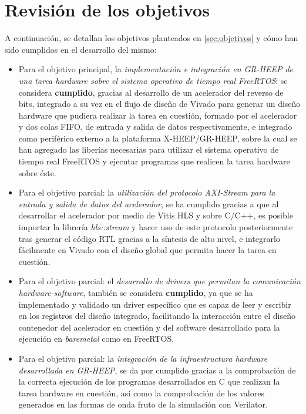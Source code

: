 \section{Revisión de los objetivos}
A continuación, se detallan los objetivos planteados en \ref{sec:objetivos} y cómo han sido cumplidos en el desarrollo del mismo:

\begin{itemize}
    \item Para el objetivo principal, la \emph{implementación e integración en GR-HEEP de una tarea hardware sobre el sistema operativo de tiempo real FreeRTOS}: se considera \textbf{cumplido}, gracias al desarrollo de un acelerador del reverso de bits, integrado a su vez en el flujo de diseño de Vivado para generar un diseño hardware que pudiera realizar la tarea en cuestión, formado por el acelerador y dos colas FIFO, de entrada y salida de datos respectivamente, e integrado como periférico externo a la plataforma X-HEEP/GR-HEEP, sobre la cual se han agregado las liberías necesarias para utilizar el sistema operativo de tiempo real FreeRTOS y ejecutar programas que realicen la tarea hardware sobre éste.
    
    \item Para el objetivo parcial: la \emph{utilización del protocolo AXI-Stream para la entrada y salida de datos del acelerador}, se ha cumplido gracias a que al desarrollar el acelerador por medio de Vitis HLS y sobre C/C++, es posible importar la librería \emph{hls::stream} y hacer uso de este protocolo posteriormente tras generar el código RTL gracias a la síntesis de alto nivel, e integrarlo fácilmente en Vivado con el diseño global que permita hacer la tarea en cuestión.

    \item Para el objetivo parcial: el \emph{desarrollo de drivers que permitan la comunicación hardware-software},
    también se considera \textbf{cumplido}, ya que se ha implementado y validado un driver específico que es capaz de leer y escribir en los registros del diseño integrado, facilitando la interacción entre el diseño contenedor del acelerador en cuestión y del software desarrollado para la ejecución en \textit{baremetal} como en FreeRTOS.
    
    \item Para el objetivo parcial: la \emph{integración de la infraestructura hardware desarrollada en GR-HEEP}, se da por cumplido gracias a la comprobación de la correcta ejecución de los programas desarrollados en C que realizan la tarea hardware en cuestión, así como la comprobación de los valores generados en las formas de onda fruto de la simulación con Verilator. 


\end{itemize}
